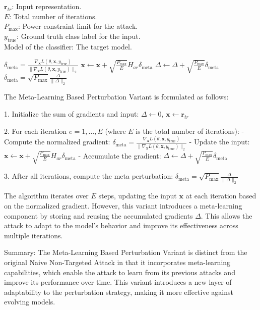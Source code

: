$\mathbf{r}_{tr}$: Input representation. \\
$E$: Total number of iterations. \\
$P_{\text{max}}$: Power constraint limit for the attack. \\
$y_{\text{true}}$: Ground truth class label for the input. \\
Model of the classifier: The target model.

$\delta_{\text{meta}} = \frac{\nabla_{\mathbf{x}} L(\theta, \mathbf{x}, y_{\text{true}})}{\|\nabla_{\mathbf{x}} L(\theta, \mathbf{x}, y_{\text{true}})\|_2}$
$\mathbf{x} \leftarrow \mathbf{x} + \sqrt{\frac{P_{\text{max}}}{E}} H_{ar} \delta_{\text{meta}}$
$\Delta \leftarrow \Delta + \sqrt{\frac{P_{\text{max}}}{E}} \delta_{\text{meta}}$
$\delta_{\text{meta}} = \sqrt{P_{\text{max}}} \frac{\Delta}{\|\Delta\|_2}$

The Meta-Learning Based Perturbation Variant is formulated as follows:

1. Initialize the sum of gradients and input:
   $ \Delta \leftarrow 0 $, $ \mathbf{x} \leftarrow \mathbf{r}_{tr} $

2. For each iteration $ e = 1, \ldots, E $ (where $ E $ is the total number of iterations):
   - Compute the normalized gradient:
     $ \delta_{\text{meta}} = \frac{\nabla_{\mathbf{x}} L(\theta, \mathbf{x}, y_{\text{true}})}{\|\nabla_{\mathbf{x}} L(\theta, \mathbf{x}, y_{\text{true}})\|_2} $
   - Update the input:
     $ \mathbf{x} \leftarrow \mathbf{x} + \sqrt{\frac{P_{\text{max}}}{E}} H_{ar} \delta_{\text{meta}} $
   - Accumulate the gradient:
     $ \Delta \leftarrow \Delta + \sqrt{\frac{P_{\text{max}}}{E}} \delta_{\text{meta}} $

3. After all iterations, compute the meta perturbation:
   $ \delta_{\text{meta}} = \sqrt{P_{\text{max}}} \frac{\Delta}{\|\Delta\|_2} $

The algorithm iterates over $E$ steps, updating the input $\mathbf{x}$ at each iteration based on the normalized gradient. However, this variant introduces a meta-learning component by storing and reusing the accumulated gradients $\Delta$. This allows the attack to adapt to the model's behavior and improve its effectiveness across multiple iterations.

Summary: The Meta-Learning Based Perturbation Variant is distinct from the original Naive Non-Targeted Attack in that it incorporates meta-learning capabilities, which enable the attack to learn from its previous attacks and improve its performance over time. This variant introduces a new layer of adaptability to the perturbation strategy, making it more effective against evolving models.